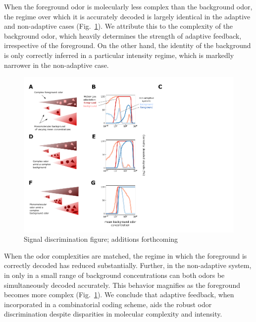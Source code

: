 When the foreground odor is molecularly less complex than the background odor, the regime over which it is accurately decoded is largely identical in the adaptive and non-adaptive cases (Fig.~\ref{fig:signal_discrimination}). We attribute this to the complexity of the background odor, which heavily determines the strength of adaptive feedback, irrespective of the foreground. On the other hand, the identity of the background is only correctly inferred in a particular intensity regime, which is markedly narrower in the non-adaptive case.






\begin{figure}
	\includegraphics[width=\textwidth]{figures/Figures_signal_discrimination_weber_law}
	\caption{Signal discrimination figure; {\color {blue} additions forthcoming}}
	\label{fig:signal_discrimination}
\end{figure}

When the odor complexities are matched, the regime in which the foreground is correctly decoded has reduced substantially. Further, in the non-adaptive system, in only in a small range of background concentrations can both odors be simultaneously decoded accurately. This behavior magnifies as the foreground becomes more complex (Fig.~\ref{fig:signal_discrimination}). We conclude that adaptive feedback, when incorporated in a combinatorial coding scheme, aids the robust odor discrimination despite disparities in molecular complexity and intensity. 



